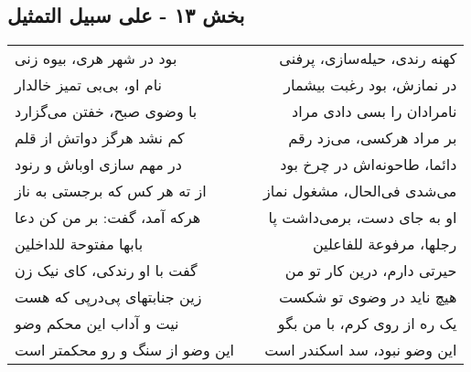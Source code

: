 \begin{center}
\section*{بخش ۱۳ - علی سبیل التمثیل}
\label{sec:013}
\begin{longtable}{l p{0.5cm} r}
بود در شهر هری، بیوه زنی
&&
کهنه رندی، حیله‌سازی، پرفنی
\\
نام او، بی‌بی تمیز خالدار
&&
در نمازش، بود رغبت بیشمار
\\
با وضوی صبح، خفتن می‌گزارد
&&
نامرادان را بسی دادی مراد
\\
کم نشد هرگز دواتش از قلم
&&
بر مراد هرکسی، می‌زد رقم
\\
در مهم سازی اوباش و رنود
&&
دائما، طاحونه‌اش در چرخ بود
\\
از ته هر کس که برجستی به ناز
&&
می‌شدی فی‌الحال، مشغول نماز
\\
هرکه آمد، گفت: بر من کن دعا
&&
او به جای دست، برمی‌داشت پا
\\
بابها مفتوحة للداخلین
&&
رجلها، مرفوعة للفاعلین
\\
گفت با او رندکی، کای نیک زن
&&
حیرتی دارم، درین کار تو من
\\
زین جنابتهای پی‌درپی که هست
&&
هیچ ناید در وضوی تو شکست
\\
نیت و آداب این محکم وضو
&&
یک ره از روی کرم، با من بگو
\\
این وضو از سنگ و رو محکمتر است
&&
این وضو نبود، سد اسکندر است
\\
\end{longtable}
\end{center}
